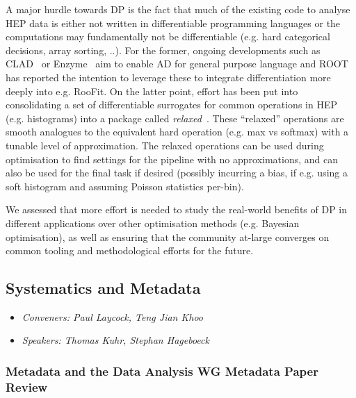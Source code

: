 \documentclass[a4paper,11pt]{article}
\begin{document}
A major hurdle towards DP is the fact that much of the existing code to
analyse HEP data is either not written in differentiable programming
languages or the computations may fundamentally not be differentiable
(e.g. hard categorical decisions, array sorting, ..). For the former,
ongoing developments such as
CLAD~\cite{Vassilev_Clad} or
Enzyme~\cite{10.1145/3458817.3476165} aim to enable AD for
general purpose language and ROOT has reported the intention to leverage
these to integrate differentiation more deeply into e.g. RooFit. On the
latter point, effort has been put into consolidating a set of
differentiable surrogates for common operations in HEP (e.g. histograms)
into a package called
\emph{relaxed}~\cite{relaxed}. These
``relaxed'' operations are smooth analogues to the equivalent hard
operation (e.g. max vs softmax) with a tunable level of approximation.
The relaxed operations can be used during optimisation to find settings
for the pipeline with no approximations, and can also be used for the
final task if desired (possibly incurring a bias, if e.g. using a soft
histogram and assuming Poisson statistics per-bin).

We assessed that more effort is needed to study the real-world benefits
of DP in different applications over other optimisation methods (e.g.
Bayesian optimisation), as well as ensuring that the community at-large
converges on common tooling and methodological efforts for the future.

\hypertarget{systematics-and-metadata}{%
\subsection{Systematics and Metadata}\label{systematics-and-metadata}}

\begin{itemize}
    \item \emph{Conveners: Paul Laycock, Teng Jian Khoo}
    \item \emph{Speakers: Thomas Kuhr, Stephan Hageboeck}
\end{itemize}

\hypertarget{metadata-and-the-data-analysis-wg-metadata-paper-review}{%
\subsubsection{\texorpdfstring{Metadata and the Data Analysis WG
Metadata Paper Review
}{Metadata and the Data Analysis WG Metadata Paper Review }}\label{metadata-and-the-data-analysis-wg-metadata-paper-review}}
\end{document}
